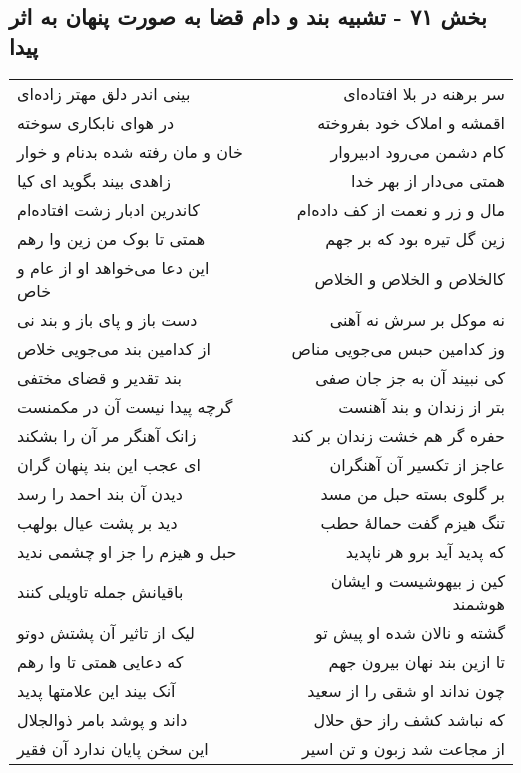 \begin{center}
\section*{بخش ۷۱ - تشبیه بند و دام قضا به صورت  پنهان به اثر پیدا}
\label{sec:sh071}
\begin{longtable}{l p{0.5cm} r}
بینی اندر دلق مهتر زاده‌ای
&&
سر برهنه در بلا افتاده‌ای
\\
در هوای نابکاری سوخته
&&
اقمشه و املاک خود بفروخته
\\
خان و مان رفته شده بدنام و خوار
&&
کام دشمن می‌رود ادبیروار
\\
زاهدی بیند بگوید ای کیا
&&
همتی می‌دار از بهر خدا
\\
کاندرین ادبار زشت افتاده‌ام
&&
مال و زر و نعمت از کف داده‌ام
\\
همتی تا بوک من زین وا رهم
&&
زین گل تیره بود که بر جهم
\\
این دعا می‌خواهد او از عام و خاص
&&
کالخلاص و الخلاص و الخلاص
\\
دست باز و پای باز و بند نی
&&
نه موکل بر سرش نه آهنی
\\
از کدامین بند می‌جویی خلاص
&&
وز کدامین حبس می‌جویی مناص
\\
بند تقدیر و قضای مختفی
&&
کی نبیند آن به جز جان صفی
\\
گرچه پیدا نیست آن در مکمنست
&&
بتر از زندان و بند آهنست
\\
زانک آهنگر مر آن را بشکند
&&
حفره گر هم خشت زندان بر کند
\\
ای عجب این بند پنهان گران
&&
عاجز از تکسیر آن آهنگران
\\
دیدن آن بند احمد را رسد
&&
بر گلوی بسته حبل من مسد
\\
دید بر پشت عیال بولهب
&&
تنگ هیزم گفت حمالهٔ حطب
\\
حبل و هیزم را جز او چشمی ندید
&&
که پدید آید برو هر ناپدید
\\
باقیانش جمله تاویلی کنند
&&
کین ز بیهوشیست و ایشان هوشمند
\\
لیک از تاثیر آن پشتش دوتو
&&
گشته و نالان شده او پیش تو
\\
که دعایی همتی تا وا رهم
&&
تا ازین بند نهان بیرون جهم
\\
آنک بیند این علامتها پدید
&&
چون نداند او شقی را از سعید
\\
داند و پوشد بامر ذوالجلال
&&
که نباشد کشف راز حق حلال
\\
این سخن پایان ندارد آن فقیر
&&
از مجاعت شد زبون و تن اسیر
\\
\end{longtable}
\end{center}
